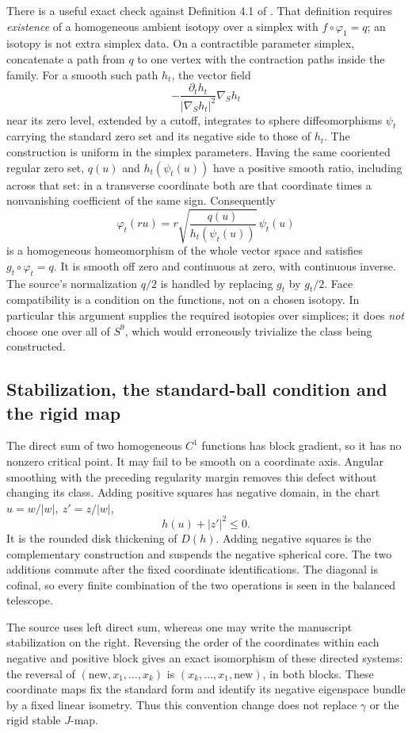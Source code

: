 \documentclass[11pt]{article}
\theoremstyle{remark}
\begin{document}
There is a useful exact check against Definition 4.1 of \cite{AAGCK}.
That definition requires \emph{existence} of a homogeneous ambient
isotopy over a simplex with \(f\circ\varphi_1=q\); an isotopy is not
extra simplex data. On a contractible parameter simplex, concatenate
a path from \(q\) to one vertex with the contraction paths inside the
family. For a smooth such path \(h_t\), the vector field
\[
 -\frac{\partial_t h_t}{|\nabla_Sh_t|^2}\nabla_Sh_t
\]
near its zero level, extended by a cutoff, integrates to sphere
diffeomorphisms \(\psi_t\) carrying the standard zero set and its
negative side to those of \(h_t\). The construction is uniform in
the simplex parameters. Having the same cooriented regular zero set,
\(q(u)\) and \(h_t(\psi_t(u))\) have a positive smooth ratio, including
across that set: in a transverse coordinate both are that coordinate
times a nonvanishing coefficient of the same sign. Consequently
\[
 \varphi_t(ru)=r
  \sqrt{\frac{q(u)}{h_t(\psi_t(u))}}\,\psi_t(u)
\]
is a homogeneous homeomorphism of the whole vector space and satisfies
\(g_t\circ\varphi_t=q\). It is smooth off zero and continuous at zero,
with continuous inverse. The source's normalization \(q/2\) is
handled by replacing \(g_t\) by \(g_t/2\).
Face compatibility is a condition on the functions, not on a chosen
isotopy. In particular this argument supplies the required isotopies
over simplices; it does \emph{not} choose one over all of \(S^9\),
which would erroneously trivialize the class being constructed.

\subsection{Stabilization, the standard-ball condition and the rigid map}
The direct sum of two homogeneous \(C^1\) functions has block
gradient, so it has no nonzero critical point. It may fail to be
smooth on a coordinate axis. Angular smoothing with the preceding
regularity margin removes this defect without changing its class.
Adding positive squares has negative domain, in the chart
\(u=w/|w|,\ z'=z/|w|\),
\[
             h(u)+|z'|^2\leq0.
\]
It is the rounded disk thickening of \(D(h)\). Adding negative
squares is the complementary construction and suspends the negative
spherical core. The two additions commute after the fixed coordinate
identifications. The diagonal is cofinal, so every finite combination
of the two operations is seen in the balanced telescope.

The source \cite{AAGCK} uses left direct sum, whereas one may write
the manuscript stabilization on the right. Reversing the order of
the coordinates within each negative and positive block gives an
exact isomorphism of these directed systems: the reversal of
\((\text{new},x_1,\ldots,x_k)\) is
\((x_k,\ldots,x_1,\text{new})\), in both blocks. These coordinate
maps fix the standard form and identify its negative eigenspace
bundle by a fixed linear isometry. Thus this convention change
does not replace \(\gamma\) or the rigid stable \(J\)-map.
\end{document}
